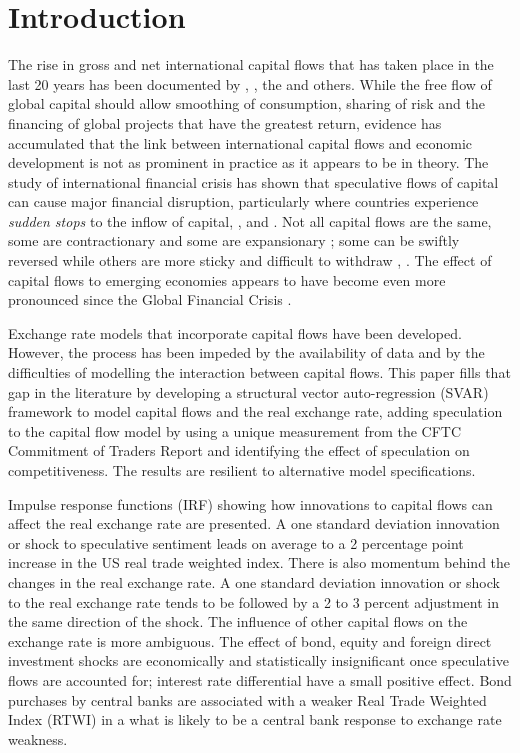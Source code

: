 \documentclass[jrfm,communication,submit,moreauthors,pdftex]{Definitions/mdpi}
\begin{document}

\section{Introduction}

The rise in gross and net international capital flows that has taken place in the last 20 years has been documented by \citet{PLane2007}, \citet{obstfeldtaylor}, the \citet{BISFX2013} and others. While the free flow of global capital should allow smoothing of consumption, sharing of risk and the financing of global projects that have the greatest return, evidence has accumulated that the link between international capital flows and economic development is not as prominent in practice as it appears to be in theory.  The study of international financial crisis has shown that speculative flows of capital can cause major financial disruption, particularly where countries experience \emph{sudden stops} to the inflow of capital, \citet{CalvoSS},\citet{DornbuschSS} and \citet{KrugmanSS}.  Not all capital flows are the same, some are contractionary and some are expansionary \citet{Blanchard2015}; some can be swiftly reversed while others are more sticky and difficult to withdraw \citet{ChuhanPerez-QuirosPopper}, \citet{ClaessensDooleyWarner}. The effect of capital flows to emerging economies appears to have become even more pronounced since the Global Financial Crisis \citet{Keef2021}. 

Exchange rate models that incorporate capital flows have been developed. However, the process has been impeded by the availability of data and by the difficulties of modelling the interaction between capital flows. This paper fills that gap in the literature by developing a structural vector auto-regression (SVAR) framework to model capital flows and the real exchange rate, adding speculation to the capital flow model by using a unique measurement from the CFTC Commitment of Traders Report and identifying the effect of speculation on competitiveness.  The results are resilient to alternative model specifications. 

Impulse response functions (IRF) showing how innovations to capital flows can affect the real exchange rate are presented. A one standard deviation innovation or shock to speculative sentiment leads on average to a 2 percentage point increase in the US real trade weighted index. There is also momentum behind the changes in the real exchange rate.  A one standard deviation innovation or shock to the real exchange rate tends to be followed by a 2 to 3 percent adjustment in the same direction of the shock. The influence of other capital flows on the exchange rate is more ambiguous.  The effect of bond, equity and foreign direct investment shocks are economically and statistically insignificant once speculative flows are accounted for; interest rate differential have a small positive effect. Bond purchases by central banks are associated with a weaker Real Trade Weighted Index (RTWI) in a what is likely to be a central bank response to exchange rate weakness. 
\end{document}
